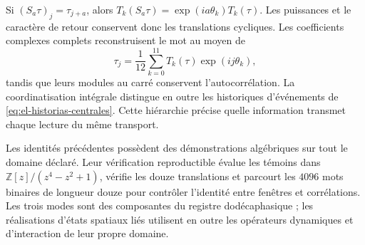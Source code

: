 Si \((S_a\tau)_j=\tau_{j+a}\), alors
\(T_k(S_a\tau)=\exp(ia\theta_k)T_k(\tau)\).
Les puissances et le caractère de retour conservent donc les
translations cycliques. Les coefficients complexes complets
reconstruisent le mot au moyen de
\[
 \tau_j=\frac1{12}\sum_{k=0}^{11}T_k(\tau)\exp(ij\theta_k),
\]
tandis que leurs modules au carré conservent l'autocorrélation.
La coordinatisation intégrale distingue en outre les historiques d'événements de
\eqref{eq:el-historias-centrales}. Cette hiérarchie précise quelle
information transmet chaque lecture du même transport.

Les identités précédentes possèdent des démonstrations algébriques sur
tout le domaine déclaré. Leur vérification reproductible évalue les
témoins dans \(\mathbb Z[z]/(z^4-z^2+1)\), vérifie les douze
translations et parcourt les \(4096\) mots binaires de longueur
douze pour contrôler l'identité entre fenêtres et corrélations.
Les trois modes sont des composantes du registre dodécaphasique ; les
réalisations d'états spatiaux liés utilisent en outre
les opérateurs dynamiques et d'interaction de leur propre domaine.
